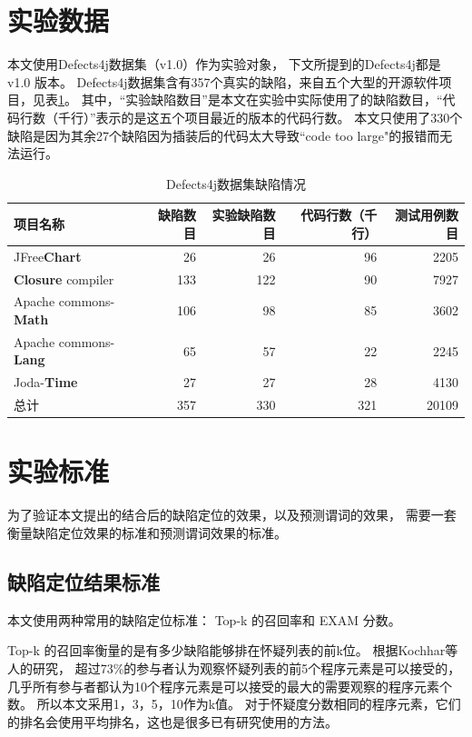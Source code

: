 \section{实验数据}

本文使用Defects4j数据集\parencite{Just2014Defects4J}（v1.0）作为实验对象，
下文所提到的Defects4j都是 v1.0 版本。
Defects4j数据集含有357个真实的缺陷，来自五个大型的开源软件项目，见表\ref{defects4j_details}。
其中，“实验缺陷数目”是本文在实验中实际使用了的缺陷数目，“代码行数（千行）”表示的是这五个项目最近的版本的代码行数。
本文只使用了330个缺陷是因为其余27个缺陷因为插装后的代码太大导致“code too large"的报错而无法运行。

\begin{table}
\centering
\begin{tabular}{|l|r|r|r|r|}
\hline
项目名称 & 缺陷数目 & 实验缺陷数目 & 代码行数（千行） & 测试用例数目 \\
\hline
JFree\textbf{Chart} & 26 & 26 & 96 & 2205 \\
\hline
\textbf{Closure} compiler & 133 & 122 & 90 & 7927 \\
\hline
Apache commons-\textbf{Math} & 106 & 98 & 85 & 3602 \\
\hline
Apache commons-\textbf{Lang} & 65 & 57 & 22 & 2245 \\
\hline
Joda-\textbf{Time} & 27 & 27 & 28 & 4130 \\
\hline
总计 & 357 & 330 & 321 & 20109 \\
\hline
\end{tabular}
\caption{Defects4j数据集缺陷情况}
\label{defects4j_details}
\end{table}

\section{实验标准}

为了验证本文提出的结合后的缺陷定位的效果，以及预测谓词的效果，
需要一套衡量缺陷定位效果的标准和预测谓词效果的标准。

\subsection{缺陷定位结果标准}

本文使用两种常用的缺陷定位标准： Top-k 的召回率和 EXAM 分数。

Top-k 的召回率衡量的是有多少缺陷能够排在怀疑列表的前k位。
根据Kochhar等人的研究\parencite{Kochhar2016Practitioners}，
超过73\%的参与者认为观察怀疑列表的前5个程序元素是可以接受的，
几乎所有参与者都认为10个程序元素是可以接受的最大的需要观察的程序元素个数。
所以本文采用1，3，5，10作为k值。
对于怀疑度分数相同的程序元素，它们的排名会使用平均排名，这也是很多已有研究使用的方法\parencite{Pearson2017Evaluating,Xuan2014Learning,Steimann2013Threats,Wong2016A}。

